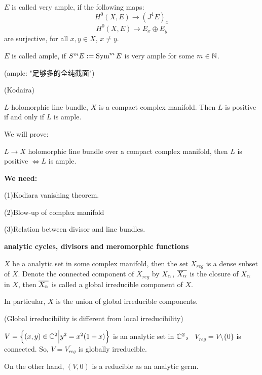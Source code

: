 \begin{definition}
$E$ is called very ample, if the following maps:
$$H^0(X,E)\to (J^1E)_x$$
$$H^0(X,E)\to E_x\oplus E_y$$
are surjective, for all $x,y\in X$, $x\neq y$.

$E$ is called ample, if $S^mE:=\operatorname{Sym}^m E$ is very ample for some $m\in\mathbb{N}$.
\end{definition}

(ample: "足够多的全纯截面")

\begin{thm}(Kodaira)

$L$-holomorphic line bundle, $X$ is a compact complex manifold.
Then $L$ is positive if and only if $L$ is ample.
\end{thm}


We will prove:

\begin{thm}
$L\to X$ holomorphic line bundle over a compact complex manifold,
then $L$ is positive $\iff L$ is ample.
\end{thm}

\textbf{We need:}

(1)Kodiara vanishing theorem.

(2)Blow-up of complex manifold

(3)Relation between divisor and line bundles.

\textbf{analytic cycles, divisors and meromorphic functions}

\begin{definition}
$X$ be a analytic set in some complex manifold, then the set
$X_{reg}$ is a dense subset of $X$.
Denote the connected component of $X_{reg}$ by $X_\alpha$,
$\overline{X_\alpha}$ is the closure of $X_\alpha$ in $X$,
then $\overline{X_\alpha}$ is called a global irreducible component of $X$.

In particular, $X$ is the union of global irreducible components.
\end{definition}

\begin{example}(Global irreducibility is different from local irreducibility)

$V=\Big\{ (x,y)\in\mathbb{C}^2 \Big| y^2=x^2(1+x) \Big\}$ is an analytic set in $\mathbb{C}^2$，
$V_{reg}=V\setminus\{0\}$ is connected. So,
$V=\overline{V_{reg}}$ is globally irreducible.

On the other hand, $(V,0)$ is a reducible as an analytic germ.
\end{example}

